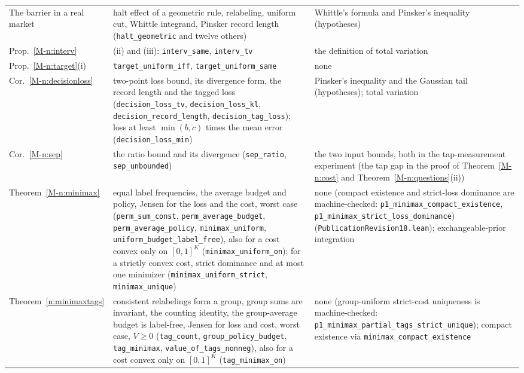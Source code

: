 \documentclass[12pt]{article}
\theoremstyle{definition}
\theoremstyle{remark}
\begin{document}
{\begin{longtable}{>{\raggedright\arraybackslash}p{}>{\raggedright\arraybackslash}p{}>{\raggedright\arraybackslash}p{}}
The barrier in a real market & halt effect of a geometric rule, relabeling, uniform cut, Whittle integrand, Pinsker record length (\texttt{halt\_geometric} and twelve others) & Whittle's formula and Pinsker's inequality (hypotheses)\\
Prop.~\ref{M-n:interv} & (ii) and (iii): \texttt{interv\_same}, \texttt{interv\_tv} & the definition of total variation\\
Prop.~\ref{M-n:target}(i) & \texttt{target\_uniform\_iff}, \texttt{target\_uniform\_same} & none\\
Cor.~\ref{M-n:decisionloss} & two-point loss bound, its divergence form, the record length and the tagged loss (\texttt{decision\_loss\_tv}, \texttt{decision\_loss\_kl}, \texttt{decision\_record\_length}, \texttt{decision\_tag\_loss}); loss at least $\min(b,c)$ times the mean error (\nolinkurl{decision_loss_min}) & Pinsker's inequality and the Gaussian tail (hypotheses); total variation\\
Cor.~\ref{M-n:sep} & the ratio bound and its divergence (\texttt{sep\_ratio}, \texttt{sep\_unbounded}) & the two input bounds, both in the tap-measurement experiment (the tap gap in the proof of Theorem~\ref{M-n:cost} and Theorem~\ref{M-n:questions}(ii))\\
Theorem~\ref{M-n:minimax} & equal label frequencies, the average budget and policy, Jensen for the loss and the cost, worst case (\texttt{perm\_sum\_const}, \texttt{perm\_average\_budget}, \texttt{perm\_average\_policy}, \texttt{minimax\_uniform}, \nolinkurl{uniform_budget_label_free}), also for a cost convex only on $[0,1]^K$ (\nolinkurl{minimax_uniform_on}); for a strictly convex cost, strict dominance and at most one minimizer (\nolinkurl{minimax_uniform_strict}, \nolinkurl{minimax_unique}) & none (compact existence and strict-loss dominance are machine-checked: \nolinkurl{p1_minimax_compact_existence}, \nolinkurl{p1_minimax_strict_loss_dominance}) (\nolinkurl{PublicationRevision18.lean}); exchangeable-prior integration\\
Theorem~\ref{n:minimaxtags} & consistent relabelings form a group, group sums are invariant, the counting identity, the group-average budget is label-free, Jensen for loss and cost, worst case, $V\ge0$ (\texttt{tag\_count}, \texttt{group\_policy\_budget}, \texttt{tag\_minimax}, \texttt{value\_of\_tags\_nonneg}), also for a cost convex only on $[0,1]^K$ (\nolinkurl{tag_minimax_on}) & none (group-uniform strict-cost uniqueness is machine-checked: \nolinkurl{p1_minimax_partial_tags_strict_unique}); compact existence via \nolinkurl{minimax_compact_existence}\\

\end{longtable}}
\end{document}
